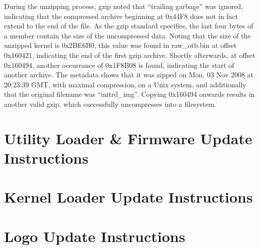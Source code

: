 \documentclass[]{article}
\begin{document}
\par During the unzipping process, gzip noted that ``trailing garbage'' was ignored, indicating that the compressed archive beginning at 0x44F8 does not in fact extend to the end of the file. As the gzip standard specifies, the last four bytes of a member contain the size of the uncompressed data. Noting that the size of the unzipped kernel is 0x2BE6B0, this value was found in raw\_otb.bin at offset 0x160421, indicating the end of the first gzip archive. Shortly afterwards, at offset 0x160494, another occurrance of 0x1F8B08 is found, indicating the start of another archive. The metadata shows that it was zipped on Mon, 03 Nov 2008 at 20:23:39 GMT, with maximal compression, on a Unix system, and additionally that the original filename was ``initrd\_img''. Copying 0x160494 onwards results in another valid gzip, which successfully uncompresses into a filesystem. 
\newpage 
\begin{appendices}
	\section{Utility Loader \& Firmware Update Instructions}
		
	\section{Kernel Loader Update Instructions}
		
	\section{Logo Update Instructions}
		
\end{appendices}
\end{document}
